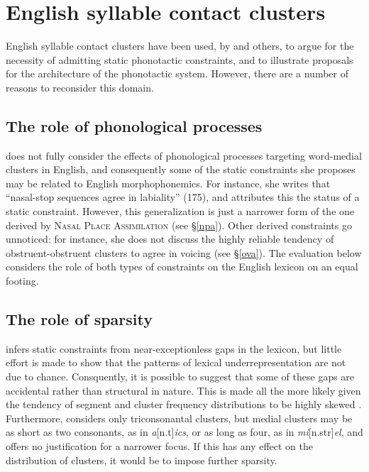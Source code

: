 \section{English syllable contact clusters}

English syllable contact clusters have been used, by \citeauthor{Pierrehumbert1994} and others, to argue for the necessity of admitting static phonotactic constraints, and to illustrate proposals for the architecture of the phonotactic system. 
However, there are a number of reasons to reconsider this domain.

\subsection{The role of phonological processes}

\citeauthor{Pierrehumbert1994} does not fully consider the effects of phonological processes targeting word-medial clusters in English, and consequently some of the static constraints she proposes may be related to English morphophonemics. 
For instance, she writes that ``nasal-stop sequences agree in labiality'' (175), and attributes this the status of a static constraint. 
However, this generalization is just a narrower form of the one derived by \textsc{Nasal Place Assimilation} (see \S\ref{npa}).
Other derived constraints go unnoticed: for instance, she does not discuss the highly reliable tendency of obstruent-obstruent clusters to agree in voicing (see \S\ref{ova}). 
The evaluation below considers the role of both types of constraints on the English lexicon on an equal footing.

\subsection{The role of sparsity}

\citet{Pierrehumbert1994} infers static constraints from near-exceptionless gaps in the lexicon, but little effort is made to show that the patterns of lexical underrepresentation are not due to chance. 
Consquently, it is possible to suggest that some of these gaps 
are accidental rather than structural in nature.
This is made all the more likely given the tendency of segment and cluster frequency distributions to be highly skewed \citep[e.g.,][]{Pande2010,Sigurd1968,Tambovtsev2007,Weiss1961}. 
Furthermore, \citeauthor{Pierrehumbert1994} considers only triconsonantal clusters, but medial clusters may be as short as two consonants, as in \emph{a}[n.t]\emph{ics}, or as long as four, as in \emph{mi}[n.str]\emph{el}, and \citeauthor{Pierrehumbert1994} offers no justification for a narrower focus.
If this has any effect on the distribution of clusters, it would be to impose further sparsity.

